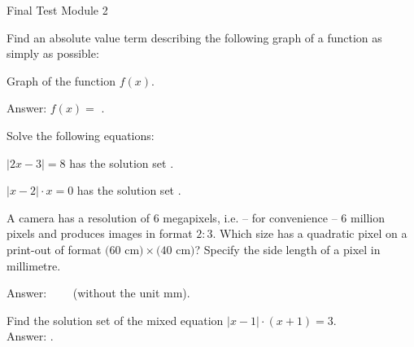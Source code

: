 \begin{MTest}{Final Test Module 2}

\begin{MExercise}
Find an absolute value term describing the following graph of a function as simply as possible:

\begin{center}
\par
Graph of the function $f(x)$.
\end{center}

Answer: $f(x)=$ \: .
\end{MExercise}

\begin{MExercise}
Solve the following equations:
\begin{MExerciseItems}
\item{$|2x-3|=8$ has the solution set .}
\item{$|x-2|\cdot x=0$ has the solution set .} 
\end{MExerciseItems}
\end{MExercise}

\begin{MExercise}
A camera has a resolution of $6$ megapixels, i.e. -- for convenience -- 
6 million pixels and produces images in format $2:3$. Which size has a 
quadratic pixel on a print-out of format $(60$ cm$) \times (40$ cm$)$? 
Specify the side length of a pixel in millimetre. 

Answer: \ \ \ \ (without the unit mm).
\end{MExercise}

\begin{MExercise}
Find the solution set of the mixed equation $|x-1|\cdot (x+1)=3$.\\
Answer: .
\end{MExercise}


\end{MTest}


\newpage
\MPrintIndex


